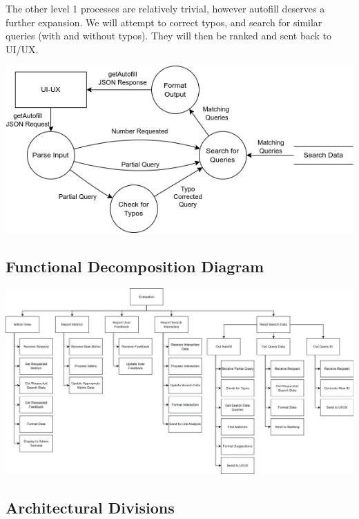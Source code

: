 \medskip

The other level 1 processes are relatively trivial, however autofill deserves a further expansion. We will attempt to correct typos, and search for similar queries (with and without typos). They will then be ranked and sent back to UI/UX.

\begin{center}
  \includegraphics[scale=0.5]{DFDs/LowLevelDFDs-GetAutofill.drawio (2).png}
\end{center}

\subsection*{Functional Decomposition Diagram}
\begin{center}
  \includegraphics[width=\textwidth]{FDD/FDD.png}
\end{center}

\subsection*{Architectural Divisions}
